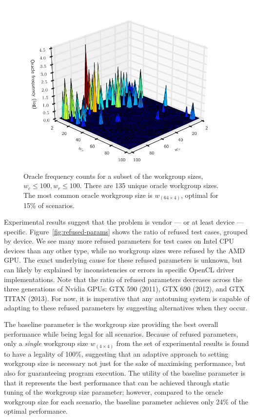 \documentclass[preprint,nonatbib,10pt]{sigplanconf}
\begin{document}
\begin{figure}
  \centering
  \vspace{-1.5em}
  \includegraphics[width=1.08\columnwidth]{oracle_param_space}
  \vspace{-2.5em}
  \caption{%
    Oracle frequency counts for a subset of the workgroup sizes,
    $w_c \le 100, w_r \le 100$. There are 135 unique oracle workgroup
    sizes. The most common oracle workgroup size is
    $w_{(64 \times 4)}$, optimal for 15\% of scenarios.
  }
\label{fig:oracle-wgsizes}
\end{figure}


Experimental results suggest that the problem is vendor --- or at
least device --- specific. Figure~\ref{fig:refused-params} shows the
ratio of refused test cases, grouped by device. We see many more
refused parameters for test cases on Intel CPU devices than any other
type, while no workgroup sizes were refused by the AMD GPU. The exact
underlying cause for these refused parameters is unknown, but can
likely by explained by inconsistencies or errors in specific OpenCL
driver implementations. Note that the ratio of refused parameters
decreases across the three generations of Nvidia GPUs: GTX 590 (2011),
GTX 690 (2012), and GTX TITAN (2013). For now, it is imperative that
any autotuning system is capable of adapting to these refused
parameters by suggesting alternatives when they occur.

The baseline parameter is the workgroup size providing the best
overall performance while being legal for all scenarios. Because of
refused parameters, only a \emph{single} workgroup size
$w_{(4 \times 4)}$ from the set of experimental results is found to
have a legality of 100\%, suggesting that an adaptive approach to
setting workgroup size is necessary not just for the sake of
maximising performance, but also for guaranteeing program
execution. The utility of the baseline parameter is that it represents
the best performance that can be achieved through static tuning of the
workgroup size parameter; however, compared to the oracle workgroup
size for each scenario, the baseline parameter achieves only 24\% of
the optimal performance.
\end{document}
